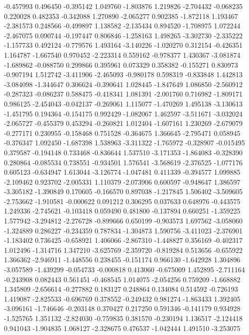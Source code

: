 -0.457993
0.496450
-0.395142
1.049760
-1.803876
1.219826
-2.704432
-0.068235
0.220028
0.482353
-0.342088
1.270890
-2.065277
0.902385
-1.872118
1.193467
-2.381573
0.248566
-0.499897
1.138582
-2.135434
0.894520
-1.708975
1.072244
-2.467075
0.090744
-0.197447
0.806846
-1.258163
1.498265
-3.302730
-2.335222
-1.157733
0.492124
-0.779576
1.493164
-3.140226
-1.020270
0.312154
-0.426351
1.164787
-1.667540
0.970452
-2.223314
0.559162
-0.978377
1.430367
-3.081874
-1.689862
-0.088750
0.299866
0.395961
0.073329
0.358382
-0.155271
0.830973
-0.907194
1.512742
-3.411906
-2.465093
-0.980178
0.598319
-0.833848
1.442813
-3.084098
-1.344647
0.306624
-0.390641
1.028445
-1.847649
1.086850
-2.560912
-0.287323
-0.086237
0.588475
-0.418341
1.081391
-2.001760
0.716982
-1.809171
0.986125
-2.454043
-0.042137
-0.269061
1.115077
-1.470269
1.495138
-3.130613
-1.451795
0.194364
-0.154175
0.992429
-1.082067
1.462597
-3.511671
-3.032024
-2.065727
-0.455379
0.453294
-0.260821
1.012404
-1.607161
1.230269
-2.679079
-0.277171
0.230955
-0.158468
0.751528
-0.364675
1.366645
-2.795471
0.058945
-0.376347
1.092450
-1.687398
1.538963
-3.311322
-1.765972
-0.328907
-0.015495
0.379587
-0.194148
0.733468
-0.836644
1.537510
-3.171353
-1.864083
-0.328390
0.280864
-0.085534
0.738551
-0.934501
1.576541
-3.568619
-2.376525
-1.077176
0.605123
-0.634947
1.613044
-3.126774
-1.047481
0.411339
-0.394577
1.099885
-2.109462
0.923702
-2.005331
1.110379
-2.073906
0.600597
-0.948647
1.386597
-3.305182
-1.390849
0.170605
-0.166570
0.897038
-1.217845
1.506402
-3.509605
-2.753662
-1.910581
-0.000622
0.091212
0.306295
0.037633
0.648976
-0.443575
1.249336
-2.745621
-0.103418
0.059490
0.481800
-0.137894
0.660251
-1.359225
1.577942
-3.294812
-2.276728
-0.899666
0.650199
-0.903573
1.697562
-3.058060
-1.324889
0.286227
-0.234359
0.787834
-1.304873
1.590756
-3.411023
-2.376901
-1.183402
0.736425
-0.658921
1.406066
-2.867310
-1.448827
0.356169
-0.402317
1.012496
-1.314716
1.347210
-3.625769
-2.359720
-0.819284
0.513656
-0.655922
1.366362
-2.946911
-1.448556
0.238455
-0.151174
0.966130
-1.642928
1.304896
-3.057589
-1.439299
-0.054733
-0.000818
0.413060
-0.675009
1.452895
-2.711164
-0.243908
0.082443
0.561451
-0.468545
1.014075
-2.054256
0.759209
-1.668882
1.345809
-2.656614
-0.277882
0.183127
0.248864
0.134084
0.514592
-0.726193
1.419087
-2.825533
-0.696769
0.378552
-0.249432
0.981274
-1.863433
1.392405
-3.096161
-1.746646
-0.203148
0.370427
0.217250
0.591346
-0.141179
0.934928
-1.525765
1.351132
-2.824030
-0.759835
0.381570
-0.230194
1.136517
-2.124418
0.941043
-1.904835
1.068127
-2.328675
0.476537
-1.042444
1.491510
-3.253075
